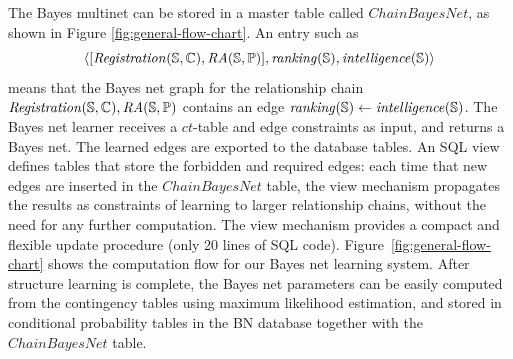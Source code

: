 \documentclass{vldb}
\newcommand{\ct}{\mathit{ct}}
\begin{document}
The Bayes multinet can be stored in a master table called {\em $ChainBayesNet$}, as shown in Figure \ref{fig:general-flow-chart}. 
An entry such as $$\langle [\reg(\S,\C),\ra(\S,\P)],\it{ranking}(\S),\it{intelligence}(\S)\rangle$$ means that the 
Bayes net graph for the relationship chain $\reg(\S,\C),\ra(\S,\P)$ contains an edge $\it{ranking}(\S)\leftarrow \it{intelligence}(\S)$. 
The Bayes net learner receives a $\ct$-table and edge constraints as input, and returns a Bayes net. The learned edges are exported to the database tables. 
An SQL view defines tables that store the forbidden and required edges: each time that new edges are inserted in the $ChainBayesNet$ table, 
the view mechanism propagates the results as constraints of learning to larger relationship chains, without the need for any further computation. 
The view mechanism provides a compact and flexible update procedure (only 20 lines of SQL code).
Figure~\ref{fig:general-flow-chart} shows the computation flow for our Bayes net learning system. 
After structure learning is complete, the Bayes net parameters can be easily computed from the contingency tables using maximum likelihood estimation, and stored in conditional probability tables in the BN database together with the $ChainBayesNet$ table.


\end{document}
